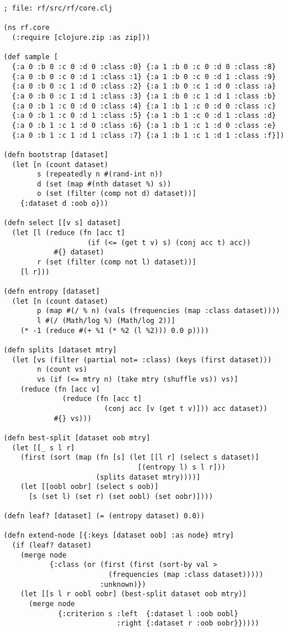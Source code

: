 \documentclass[a4paper,man,12pt,apacite,floatsintext]{apa6} %
\begin{document}
\newpage
\begin{verbatim}
; file: rf/src/rf/core.clj

(ns rf.core
  (:require [clojure.zip :as zip]))

(def sample [
  {:a 0 :b 0 :c 0 :d 0 :class :0} {:a 1 :b 0 :c 0 :d 0 :class :8}
  {:a 0 :b 0 :c 0 :d 1 :class :1} {:a 1 :b 0 :c 0 :d 1 :class :9}
  {:a 0 :b 0 :c 1 :d 0 :class :2} {:a 1 :b 0 :c 1 :d 0 :class :a}
  {:a 0 :b 0 :c 1 :d 1 :class :3} {:a 1 :b 0 :c 1 :d 1 :class :b}
  {:a 0 :b 1 :c 0 :d 0 :class :4} {:a 1 :b 1 :c 0 :d 0 :class :c}
  {:a 0 :b 1 :c 0 :d 1 :class :5} {:a 1 :b 1 :c 0 :d 1 :class :d}
  {:a 0 :b 1 :c 1 :d 0 :class :6} {:a 1 :b 1 :c 1 :d 0 :class :e}
  {:a 0 :b 1 :c 1 :d 1 :class :7} {:a 1 :b 1 :c 1 :d 1 :class :f}])

(defn bootstrap [dataset]
  (let [n (count dataset)
        s (repeatedly n #(rand-int n))
        d (set (map #(nth dataset %) s))
        o (set (filter (comp not d) dataset))]
    {:dataset d :oob o}))

(defn select [[v s] dataset]
  (let [l (reduce (fn [acc t]
                    (if (<= (get t v) s) (conj acc t) acc))
            #{} dataset)
        r (set (filter (comp not l) dataset))]
    [l r]))

(defn entropy [dataset]
  (let [n (count dataset)
        p (map #(/ % n) (vals (frequencies (map :class dataset))))
        l #(/ (Math/log %) (Math/log 2))]
    (* -1 (reduce #(+ %1 (* %2 (l %2))) 0.0 p))))

(defn splits [dataset mtry]
  (let [vs (filter (partial not= :class) (keys (first dataset)))
        n (count vs)
        vs (if (<= mtry n) (take mtry (shuffle vs)) vs)]
    (reduce (fn [acc v]
              (reduce (fn [acc t]
                        (conj acc [v (get t v)])) acc dataset))
            #{} vs)))

(defn best-split [dataset oob mtry]
  (let [[_ s l r]
    (first (sort (map (fn [s] (let [[l r] (select s dataset)]
                                [(entropy l) s l r]))
                      (splits dataset mtry))))]
    (let [[oobl oobr] (select s oob)]
      [s (set l) (set r) (set oobl) (set oobr)])))

(defn leaf? [dataset] (= (entropy dataset) 0.0))

(defn extend-node [{:keys [dataset oob] :as node} mtry]
  (if (leaf? dataset)
    (merge node
           {:class (or (first (first (sort-by val >
                         (frequencies (map :class dataset)))))
                       :unknown)})
    (let [[s l r oobl oobr] (best-split dataset oob mtry)]
      (merge node
             {:criterion s :left  {:dataset l :oob oobl}
                           :right {:dataset r :oob oobr}}))))


\end{verbatim}
\end{document}
